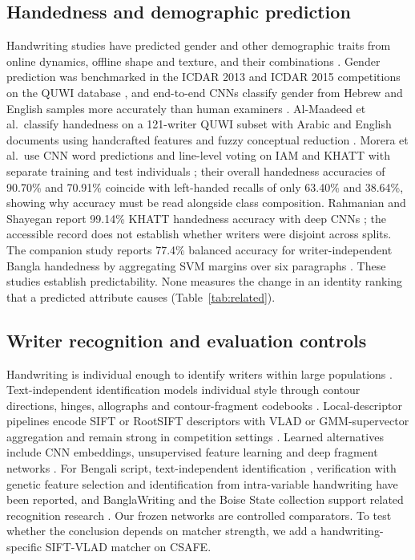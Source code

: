\documentclass[ASNA,twocolumn]{USG}
\begin{document}
\subsection{Handedness and demographic prediction}
Handwriting studies have predicted gender and other demographic traits from online dynamics, offline shape and texture, and their combinations \cite{liwicki2011gender,siddiqi2015gender,bouadjenek2016soft}. Gender prediction was benchmarked in the ICDAR 2013 and ICDAR 2015 competitions on the QUWI database \cite{hassaine2013icdar,djeddi2015icdar}, and end-to-end CNNs classify gender from Hebrew and English samples more accurately than human examiners \cite{illouz2018gender}. Al-Maadeed et al.\ classify handedness on a 121-writer QUWI subset with Arabic and English documents using handcrafted features and fuzzy conceptual reduction \cite{almaadeed2016handedness}. Morera et al.\ use CNN word predictions and line-level voting on IAM and KHATT with separate training and test individuals \cite{morera2018handedness}; their overall handedness accuracies of 90.70\% and 70.91\% coincide with left-handed recalls of only 63.40\% and 38.64\%, showing why accuracy must be read alongside class composition. Rahmanian and Shayegan report 99.14\% KHATT handedness accuracy with deep CNNs \cite{rahmanian2021handedness}; the accessible record does not establish whether writers were disjoint across splits. The companion study reports 77.4\% balanced accuracy for writer-independent Bangla handedness by aggregating SVM margins over six paragraphs \cite{prappo2026handedness}. These studies establish predictability. None measures the change in an identity ranking that a predicted attribute causes (Table~\ref{tab:related}).

\subsection{Writer recognition and evaluation controls}
Handwriting is individual enough to identify writers within large populations \cite{srihari2002individuality}. Text-independent identification models individual style through contour directions, hinges, allographs and contour-fragment codebooks \cite{bulacu2007text,schomaker2007codebooks}. Local-descriptor pipelines encode SIFT or RootSIFT descriptors \cite{lowe2004sift,arandjelovic2012rootsift} with VLAD or GMM-supervector aggregation \cite{jegou2010vlad,christlein2017gmm} and remain strong in competition settings \cite{louloudis2013icdar}. Learned alternatives include CNN embeddings, unsupervised feature learning and deep fragment networks \cite{fiel2015cnn,christlein2017unsupervised,he2020fragnet}. For Bengali script, text-independent identification \cite{chanda2010bengali}, verification with genetic feature selection \cite{paul2024bangla} and identification from intra-variable handwriting \cite{adak2019intravariable} have been reported, and BanglaWriting and the Boise State collection support related recognition research \cite{mridha2021banglawriting,majid2018bangla}. Our frozen networks are controlled comparators. To test whether the conclusion depends on matcher strength, we add a handwriting-specific SIFT-VLAD matcher on CSAFE.
\end{document}
